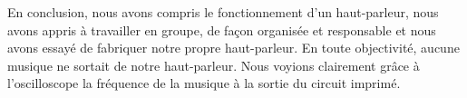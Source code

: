 

En conclusion, nous avons compris le fonctionnement d’un haut-parleur,  
nous avons appris à travailler en groupe, de façon organisée et responsable
et nous avons essayé de fabriquer notre propre haut-parleur.  En toute objectivité,
aucune musique ne sortait de notre haut-parleur.  Nous voyions clairement grâce 
à l’oscilloscope la fréquence de la musique à la sortie du circuit imprimé.     


